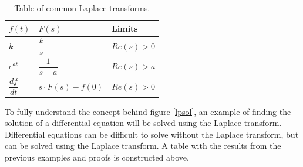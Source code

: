 \begin{table}[H]
\center
\begin{tabular}{lll}
\hline
\multicolumn{1}{|l|}{$f(t)$}           & \multicolumn{1}{l|}{$F(s)$}                & \multicolumn{1}{l|}{Limits}    \\ \hline
\multicolumn{1}{|l|}{$k$}              & \multicolumn{1}{l|}{$\dfrac{k}{s}$}        & \multicolumn{1}{l|}{$Re(s)>0$} \\ \hline
\multicolumn{1}{|l|}{$e^{at}$}         & \multicolumn{1}{l|}{$\dfrac{1}{s-a}$}      & \multicolumn{1}{l|}{$Re(s)>a$} \\ \hline
\multicolumn{1}{|l|}{$\dfrac{df}{dt}$} & \multicolumn{1}{l|}{$s \cdot F(s) - f(0)$} & \multicolumn{1}{l|}{$Re(s)>0$} \\ \hline                          
\end{tabular}
\caption{Table of common Laplace transforms.}
\label{lptable}
\end{table}
\noindent To fully understand the concept behind figure \ref{lpsol}, an example of finding the solution of a differential equation will be solved using the Laplace transform. Differential equations can be difficult to solve without the Laplace transform, but can be solved using the Laplace transform. A table with the results from the previous examples and proofs is constructed above.
\\
